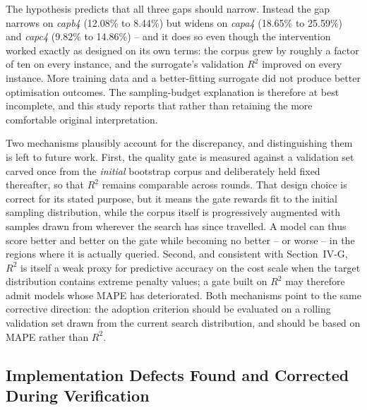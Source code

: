 \documentclass[conference]{IEEEtran}
\begin{document}
The hypothesis predicts that all three gaps should narrow. Instead the gap
narrows on \emph{capb4} (12.08\% to 8.44\%) but widens on \emph{capa4}
(18.65\% to 25.59\%) and \emph{capc4} (9.82\% to 14.86\%) -- and it does so
even though the intervention worked exactly as designed on its own terms: the
corpus grew by roughly a factor of ten on every instance, and the surrogate's
validation $R^2$ improved on every instance. More training data and a
better-fitting surrogate did not produce better optimisation outcomes. The
sampling-budget explanation is therefore at best incomplete, and this study
reports that rather than retaining the more comfortable original
interpretation.

Two mechanisms plausibly account for the discrepancy, and distinguishing them
is left to future work. First, the quality gate is measured against a
validation set carved once from the \emph{initial} bootstrap corpus and
deliberately held fixed thereafter, so that $R^2$ remains comparable across
rounds. That design choice is correct for its stated purpose, but it means the
gate rewards fit to the initial sampling distribution, while the corpus itself
is progressively augmented with samples drawn from wherever the search has
since travelled. A model can thus score better and better on the gate while
becoming no better -- or worse -- in the regions where it is actually queried.
Second, and consistent with Section~IV-G, $R^2$ is itself a weak proxy for
predictive accuracy on the cost scale when the target distribution contains
extreme penalty values; a gate built on $R^2$ may therefore admit models whose
MAPE has deteriorated. Both mechanisms point to the same corrective direction:
the adoption criterion should be evaluated on a rolling validation set drawn
from the current search distribution, and should be based on MAPE rather than
$R^2$.

\subsection{Implementation Defects Found and Corrected During Verification}
\end{document}
